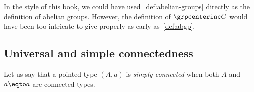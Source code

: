 \begin{remark}
  In the style of this book, we could have
  used~\cref{def:abelian-groups} directly as the definition of abelian
  groups. However, the definition of $\grpcenterinc G$ would have been
  too intricate to give properly as early as~\cref{def:abgp}.
\end{remark}

\subsection{Universal \covering and simple connectedness}
\label{sec:univ-cover-simple}

Let us say that a pointed type $(A,a)$ is {\em simply connected} when
both $A$ and $a\eqto a$ are connected types.

